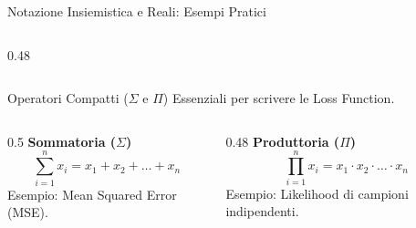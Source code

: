 \documentclass[aspectratio=169, 10pt]{beamer}
\begin{document}
\begin{frame}{Notazione Insiemistica e Reali: Esempi Pratici}
\begin{columns}[T]
\begin{column}{0.48\textwidth}
        \end{column}
    \end{columns}
\end{frame}

\begin{frame}{Operatori Compatti ($\Sigma$ e $\Pi$)}
    Essenziali per scrivere le Loss Function.
    
    \begin{columns}[T]
        \begin{column}{0.5\textwidth}
            \textbf{Sommatoria ($\Sigma$)}
            \[ \sum_{i=1}^{n} x_i = x_1 + x_2 + \dots + x_n \]
            Esempio: Mean Squared Error (MSE).
        \end{column}
        \begin{column}{0.48\textwidth}
            \textbf{Produttoria ($\Pi$)}
            \[ \prod_{i=1}^{n} x_i = x_1 \cdot x_2 \cdot \dots \cdot x_n \]
            Esempio: Likelihood di campioni indipendenti.
        \end{column}
    \end{columns}
\end{frame}
\end{document}
